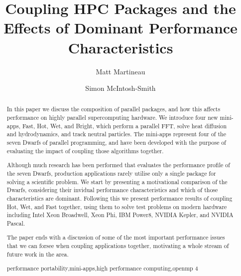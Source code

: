 \documentclass[runningheads,a4paper]{llncs}
\newcommand{\keywords}[1]{\par\addvspace\baselineskip
\noindent\keywordname\enspace\ignorespaces#1}
\begin{document}
\mainmatter  %

\title{Coupling HPC Packages and the Effects of Dominant Performance Characteristics}


\author{Matt Martineau \and Simon McIntosh-Smith}
%


%
%

\maketitle


\begin{abstract}
  In this paper we discuss the composition of parallel packages, and how this affects performance on highly parallel supercomputing hardware. We introduce four new mini-apps, Fast, Hot, Wet, and Bright, which perform a parallel FFT, solve heat diffusion and hydrodynamics, and track neutral particles. The mini-apps represent four of the seven Dwarfs of parallel programming, and have been developed with the purpose of evaluating the impact of coupling those algorithms together.

  Although much research has been performed that evaluates the performance profile of the seven Dwarfs, production applications rarely utilise only a single package for solving a scientific problem. We start by presenting a motivational comparison of the Dwarfs, considering their invidual performance characteristics and which of those characteristics are dominant. Following this we present performance results of coupling Hot, Wet, and Fast together, using them to solve test problems on modern hardware including Intel Xeon Broadwell, Xeon Phi, IBM Power8, NVIDIA Kepler, and NVIDIA Pascal.

  The paper ends with a discussion of some of the most important performance issues that we can forsee when coupling applications together, motivating a whole stream of future work in the area.

\keywords{performance portability,mini-apps,high performance computing,openmp 4}
\end{abstract}
\end{document}
